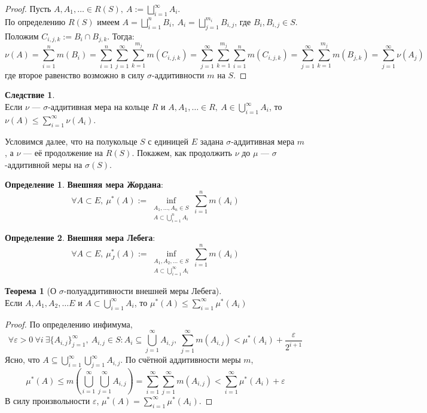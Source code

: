 \documentclass[11pt,a4paper]{report}
\def\eps{\varepsilon}
\theoremstyle{definition}
\theoremstyle{definition}
\newtheorem{theorem}{Теорема}[section]
\newtheorem{corollary}{Следствие}[section]
\theoremstyle{definition}
\newtheorem{definition}{Определение}[section]
\begin{document}
	\begin{proof}
		Пусть $ A, A_{1}, \dots \in R(S),\ A := \bigsqcup_{i=1}^{\infty}{A_{i}} $.\\
		По определению $ R(S) $ имеем $ A = \bigsqcup_{i=1}^{n}{B_{i}},\ A_{i} = \bigsqcup_{j=1}^{m_{i}}{B_{i, j}} $, где $ B_{i}, B_{i, j} \in S $.\\
		Положим $ C_{i, j, k} := B_{i} \cap B_{j, k} $. Тогда: 
		\[ \nu(A) = \sum_{i=1}^{n}{m(B_{i})} = \sum_{i=1}^{n}{\sum_{j=1}^{\infty}{\sum_{k=1}^{m_{j}}{m(C_{i, j, k})}}} = \sum_{j=1}^{\infty}{\sum_{k=1}^{m_{j}}{\sum_{i=1}^{n}{m(C_{i, j, k})}}} = \sum_{j=1}^{\infty}{\sum_{k=1}^{m_{j}}{m(B_{j, k})}} = \sum_{j=1}^{\infty}{\nu(A_{j})} \]
		где второе равенство возможно в силу $ \sigma $-аддитивности $ m $ на $ S $.
	\end{proof}
	\begin{corollary}$  $\\
		Если $ \nu $ — $ \sigma $-аддитивная мера на кольце $ R $ и $ A, A_{1}, \dots \in R,\ A \in \bigcup_{i=1}^{\infty}{A_{i}} $, то $ \nu(A) \le \sum_{i=1}^{\infty}{\nu(A_{i})} $.
	\end{corollary}
	\noindent Условимся далее, что на полукольце $ S $ с единицей $ E $ задана $ \sigma $-аддитивная мера $ m $, а $ \nu $ — её продолжение на $ R(S) $. Покажем, как продолжить $ \nu $ до $ \mu $ — $ \sigma $-аддитивной меры на $ \sigma(S) $.
	\begin{definition}
		\textbf{Внешняя мера Жордана}:
		\[ \forall A \subset E,\ \mu^{*}(A) := \inf_{\substack{A_{1}, \dots, A_{n} \in S\\A\subset\bigcup_{i=1}^{n}{A_{i}}}}{\sum_{i=1}^{n}{m(A_{i})}} \]
	\end{definition}
	\begin{definition}
		\textbf{Внешняя мера Лебега}:
		\[ \forall A \subset E,\ \mu_{J}^{*}(A) := \inf_{\substack{A_{1}, A_{2}, \dots \in S\\A\subset\bigcup_{i=1}^{\infty}{A_{i}}}}{\sum_{i=1}^{n}{m(A_{i})}} \]
	\end{definition}
	\begin{theorem}[О $ \sigma $-полуаддитивности внешней меры Лебега]$  $\\
		Если $ A, A_{1}, A_{2}, \dots E $ и $ A \subset \bigcup_{i=1}^{\infty}{A_{i}} $, то $ \mu^{*}(A) \le \sum_{i=1}^{\infty}{\mu^{*}(A_{i})} $
	\end{theorem}
	\begin{proof}
		По определению инфимума, 
		\[ \forall \eps > 0\ \forall i\ \exists \{A_{i, j}\}_{j=1}^{\infty},\ A_{i, j} \in S: A_{i} \subseteq \bigcup_{j=1}^{\infty}{A_{i, j}},\ \sum_{j=1}^{\infty}{m(A_{i, j})} < \mu^{*}(A_{i}) + \frac{\eps}{2^{i+1}} \]
		Ясно, что $ A \subseteq \bigcup_{i=1}^{\infty}{\bigcup_{j=1}^{\infty}{A_{i, j}}} $. По счётной аддитивности меры $ m $, 
		\[ \mu^{*}(A) \le m\left (\bigcup_{i=1}^{\infty}{\bigcup_{j=1}^{\infty}{A_{i, j}}}\right ) = \sum_{i=1}^{\infty}{\sum_{j=1}^{\infty}{m(A_{i, j})}} < \sum_{i=1}^{\infty}{\mu^{*}(A_{i})} + \eps \]
		В силу произвольности $ \eps $, $ \mu^{*}(A) = \sum_{i=1}^{\infty}{\mu^{*}(A_{i})} $.
	\end{proof}
\end{document}
